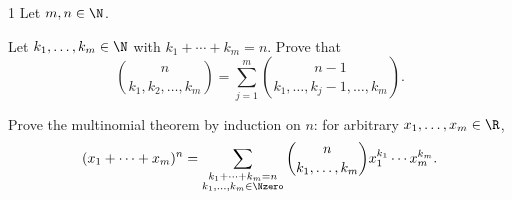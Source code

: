 \documentclass[11pt,oneside]{article}
\begin{document}


\begin{problem}{1}
Let $m,n\in\N$.
\begin{problemsubparts}
    \item Let $k_1,\ldots,k_m\in\N$ with $k_1+\cdots+k_m=n$. Prove that
    \[
        \binom{n}{k_1,k_2,\ldots,k_m}
        =\sum_{j=1}^{m}
        \binom{n-1}{k_1,\ldots,k_j-1,\ldots,k_m}.
    \]

    \item Prove the multinomial theorem by induction on $n$: for arbitrary $x_1,\ldots,x_m\in\R$,
    \[
        (x_1+\cdots+x_m)^n
        =\sum_{\substack{k_1+\cdots+k_m=n\\k_1,\ldots,k_m\in\Nzero}}
        \binom{n}{k_1,\ldots,k_m}
        x_1^{k_1}\cdots x_m^{k_m}.
    \]
\end{problemsubparts}
\end{problem}
\end{document}
